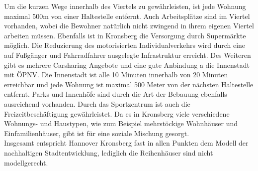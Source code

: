 \documentclass[12pt,a4paper]{report}
\begin{document}
	Um die kurzen Wege innerhalb des Viertels zu gewährleisten, ist jede Wohnung maximal 500m von einer Haltestelle entfernt.
	Auch Arbeitsplätze sind im Viertel vorhanden, wobei die Bewohner natürlich nicht zwingend in ihrem eigenen Viertel arbeiten müssen.
	Ebenfalls ist in Kronsberg die Versorgung durch Supermärkte möglich.
	Die Reduzierung des motorisierten Individualverkehrs wird durch eine auf Fußgänger und Fahrradfahrer ausgelegte Infrastruktur erreicht.
	Des Weiteren gibt es mehrere Carsharing Angebote und eine gute Anbindung a die Innenstadt mit ÖPNV.
	Die Innenstadt ist alle 10 Minuten innerhalb von 20 Minuten erreichbar und jede Wohnung ist maximal 500 Meter von der nächsten Haltestelle entfernt.
	Parks und Innenhöfe sind durch die Art der Bebauung ebenfalls ausreichend vorhanden.
	Durch das Sportzentrum ist auch die Freizeitbeschäftigung gewährleistet.
	Da es in Kronsberg viele verschiedene Wohnungs- und Haustypen, wie zum Beispiel mehrstöckige Wohnhäuser und Einfamilienhäuser, gibt ist für eine soziale Mischung gesorgt. \\
	Insgesamt entspricht Hannover Kronsberg fast in allen Punkten dem Modell der nachhaltigen Stadtentwicklung, lediglich die Reihenhäuser sind nicht modellgerecht.
\end{document}
